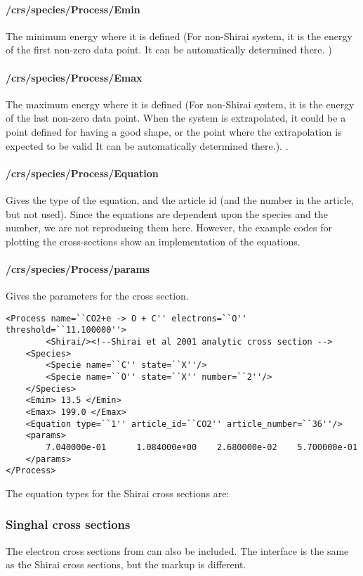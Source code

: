 \paragraph{/crs/species/Process/Emin} The minimum energy where it is defined (For non-Shirai system, it is the energy of the first non-zero data point. It can be automatically determined there. )
\paragraph{/crs/species/Process/Emax} The maximum energy where it is defined (For non-Shirai system, it is the energy of the last non-zero data point. When the system is extrapolated, it could be a point defined for having a good shape, or the point where the extrapolation is expected to be valid It can be automatically determined there.).
.
\paragraph{/crs/species/Process/Equation} Gives the type of the equation, and the article id (and the number in the article, but not used). Since the equations are dependent upon the species and the number, we are not reproducing them here. However, the example codes for plotting the cross-sections show an implementation of the equations. 

\paragraph{/crs/species/Process/params} Gives the parameters for the cross section.


\begin{verbatim}
<Process name=``CO2+e -> O + C'' electrons=``O'' threshold=``11.100000''>
		<Shirai/><!--Shirai et al 2001 analytic cross section -->
	<Species>
		<Specie name=``C'' state=``X''/>
		<Specie name=``O'' state=``X'' number=``2''/>
	</Species>
	<Emin> 13.5 </Emin>
	<Emax> 199.0 </Emax>
	<Equation type=``1'' article_id=``CO2'' article_number=``36''/>
	<params>
		7.040000e-01	  1.084000e+00	  2.680000e-02	  5.700000e-01
	</params>
</Process>
\end{verbatim}


The equation types for the Shirai cross sections are:

\subsubsection{Singhal cross sections}
The electron cross sections from \citet{Singhal2009} can also be included. The interface is the same as the Shirai cross sections, but the markup is different.

